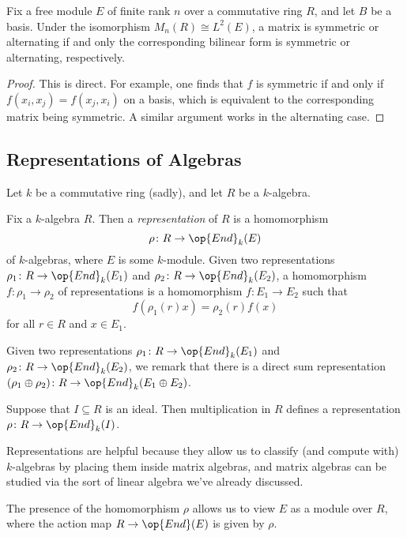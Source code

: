 \documentclass[../notes.tex]{subfiles}
\begin{document}
\begin{proposition}
	Fix a free module $E$ of finite rank $n$ over a commutative ring $R$, and let $B$ be a basis. Under the isomorphism $M_n(R)\cong L^2(E)$, a matrix is symmetric or alternating if and only the corresponding bilinear form is symmetric or alternating, respectively.
\end{proposition}
\begin{proof}
	This is direct. For example, one finds that $f$ is symmetric if and only if $f(x_i,x_j)=f(x_j,x_i)$ on a basis, which is equivalent to the corresponding matrix being symmetric. A similar argument works in the alternating case.
\end{proof}

\subsection{Representations of Algebras}
Let $k$ be a commutative ring (sadly), and let $R$ be a $k$-algebra.
\begin{definition}[representation]
	Fix a $k$-algebra $R$. Then a \textit{representation} of $R$ is a homomorphism
	\[\rho\colon R\to\op{End}_k(E)\]
	of $k$-algebras, where $E$ is some $k$-module. Given two representations $\rho_1\colon R\to\op{End}_k(E_1)$ and $\rho_2\colon R\to\op{End}_k(E_2)$, a homomorphism $f\colon\rho_1\to\rho_2$ of representations is a homomorphism $f\colon E_1\to E_2$ such that
	\[f(\rho_1(r)x)=\rho_2(r)f(x)\]
	for all $r\in R$ and $x\in E_1$.
\end{definition}
\begin{remark}
	Given two representations $\rho_1\colon R\to\op{End}_k(E_1)$ and $\rho_2\colon R\to\op{End}_k(E_2)$, we remark that there is a direct sum representation $(\rho_1\oplus\rho_2)\colon R\to\op{End}_k(E_1\oplus E_2)$.
\end{remark}
\begin{example}
	Suppose that $I\subseteq R$ is an ideal. Then multiplication in $R$ defines a representation $\rho\colon R\to\op{End}_k(I)$.
\end{example}
Representations are helpful because they allow us to classify (and compute with) $k$-algebras by placing them inside matrix algebras, and matrix algebras can be studied via the sort of linear algebra we've already discussed.
\begin{remark}
	The presence of the homomorphism $\rho$ allows us to view $E$ as a module over $R$, where the action map $R\to\op{End}(E)$ is given by $\rho$.
\end{remark}
\end{document}
